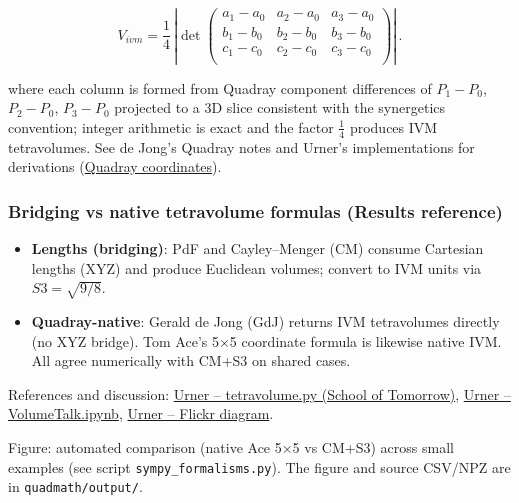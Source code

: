 \documentclass[
]{article}
\providecommand{\tightlist}{%
  \setlength{\itemsep}{0pt}\setlength{\parskip}{0pt}}
\begin{document}
\begin{itemize}
  \begin{equation}\label{eq:gdj}
  V_{ivm} = \frac{1}{4}\,\left|\det \begin{pmatrix}
  a_1-a_0 & a_2-a_0 & a_3-a_0 \\
  b_1-b_0 & b_2-b_0 & b_3-b_0 \\
  c_1-c_0 & c_2-c_0 & c_3-c_0 \\
  \end{pmatrix}\right|\,.
  \end{equation}

  where each column is formed from Quadray component differences of
  \(P_1-P_0\), \(P_2-P_0\), \(P_3-P_0\) projected to a 3D slice
  consistent with the synergetics convention; integer arithmetic is
  exact and the factor \(\tfrac{1}{4}\) produces IVM tetravolumes. See
  de Jong's Quadray notes and Urner's implementations for derivations
  (\href{https://en.wikipedia.org/wiki/Quadray_coordinates}{Quadray
  coordinates}).
\end{itemize}

\hypertarget{bridging-vs-native-tetravolume-formulas-results-reference}{%
\subsubsection{Bridging vs native tetravolume formulas (Results
reference)}\label{bridging-vs-native-tetravolume-formulas-results-reference}}

\begin{itemize}
\tightlist
\item
  \textbf{Lengths (bridging)}: PdF and Cayley--Menger (CM) consume
  Cartesian lengths (XYZ) and produce Euclidean volumes; convert to IVM
  units via \(S3 = \sqrt{9/8}\).
\item
  \textbf{Quadray-native}: Gerald de Jong (GdJ) returns IVM tetravolumes
  directly (no XYZ bridge). Tom Ace's 5×5 coordinate formula is likewise
  native IVM. All agree numerically with CM+S3 on shared cases.
\end{itemize}

References and discussion:
\href{https://github.com/4dsolutions/School_of_Tomorrow/blob/master/tetravolume.py}{Urner
-- tetravolume.py (School of Tomorrow)},
\href{https://github.com/4dsolutions/School_of_Tomorrow/blob/master/VolumeTalk.ipynb}{Urner
-- VolumeTalk.ipynb}, \href{https://flic.kr/p/2rn22en}{Urner -- Flickr
diagram}.

Figure: automated comparison (native Ace 5×5 vs CM+S3) across small
examples (see script \texttt{sympy\_formalisms.py}). The figure and
source CSV/NPZ are in \texttt{quadmath/output/}.
\end{document}
